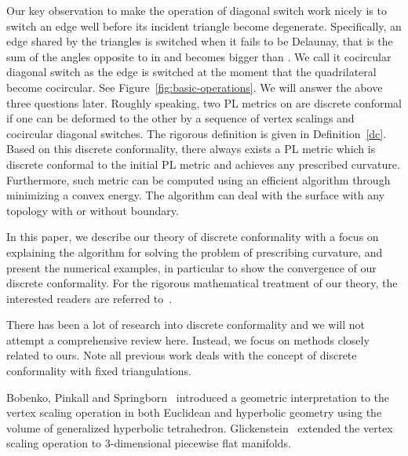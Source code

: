 \documentclass[11pt]{article}
\begin{document}
Our key observation to make the operation of diagonal switch work nicely is to switch an edge 
well before its incident triangle become degenerate. Specifically, an edge  shared by the triangles 
is switched when it fails to be Delaunay, that is the sum of the angles opposite to  in  and 
becomes bigger than . We call it cocircular diagonal switch 
as the edge  is switched at the moment that the quadrilateral  
become cocircular. See Figure~\ref{fig:basic-operations}.
We will answer the above three questions later. 
Roughly speaking,  two PL metrics on  are discrete conformal if one can be deformed to the other by a sequence of vertex 
scalings and cocircular diagonal switches. The rigorous definition is given in Definition~\ref{dc}. Based on this discrete
conformality, there always exists a PL metric which is discrete conformal to the initial PL metric and 
achieves any prescribed curvature. Furthermore, such metric can be computed using an efficient algorithm through
minimizing a convex energy. The algorithm can deal with the surface with any topology with or without boundary. 

In this paper, we describe our theory of discrete conformality with a focus on explaining
the algorithm for solving the problem of prescribing curvature, and present the
numerical examples, in particular to show the convergence of our discrete conformality. 
For the rigorous mathematical treatment of our theory, the interested readers are 
referred to~\cite{glsw1, glsw2}. 

\vspace{0.1in}
There has been a lot of research into discrete conformality and we will not attempt 
a comprehensive review here. Instead, we focus on methods closely related to 
ours. Note all previous work deals with the concept of discrete conformality with 
fixed triangulations.  

Bobenko, Pinkall and Springborn~\cite{bps} introduced a geometric interpretation 
to the vertex scaling operation in both Euclidean and hyperbolic geometry using the 
volume of generalized hyperbolic tetrahedron. Glickenstein~\cite{Glickenstein1, Glickenstein2} 
extended the vertex scaling operation  to 3-dimensional piecewise flat manifolds.
\end{document}
